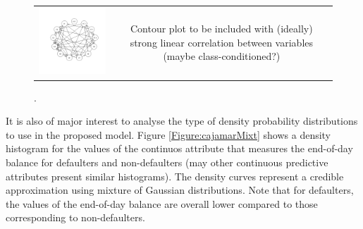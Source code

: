 \begin{figure}
  \centering
    \begin{tabular}{cc}
    \includegraphics[width=70mm]{figures/CajaMarBayesianNetwork}&
    \begin{minipage}[b]{0.45\linewidth} Contour plot to be included with (ideally) strong linear correlation between variables (maybe class-conditioned?) \end{minipage}\\
  \end{tabular}
    \caption{\label{Figure:cajamarDependences}.}
\end{figure}

It is also of major interest to analyse the type of density probability distributions to use in the proposed model. Figure \ref{Figure:cajamarMixt} shows a density histogram for the values of the continuos attribute that measures the end-of-day balance for defaulters and non-defaulters (may other continuous predictive attributes present similar histograms). The density curves represent a credible approximation using mixture of Gaussian distributions. Note that for defaulters, the values of the end-of-day balance are overall lower compared to those corresponding to non-defaulters.

